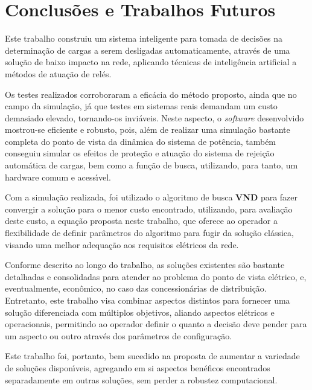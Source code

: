 \chapter{Conclus{\~o}es e Trabalhos Futuros} \label{cap:concl}

Este trabalho construiu um sistema inteligente para tomada de decis{\~o}es na determina{\c c}{\~a}o de cargas a serem desligadas automaticamente, atrav{\'e}s de uma solu{\c c}{\~a}o de baixo impacto na rede, aplicando t{\'e}cnicas de intelig{\^e}ncia artificial a m{\'e}todos de atua{\c c}{\~a}o de rel{\'e}s.

Os testes realizados corroboraram a efic{\'a}cia do m{\'e}todo proposto, ainda que no campo da simula{\c c}{\~a}o, j{\'a} que testes em sistemas reais demandam um custo demasiado elevado, tornando-os invi{\'a}veis. Neste aspecto, o \textit{software} desenvolvido mostrou-se eficiente e robusto, pois, al{\'e}m de realizar uma simula{\c c}{\~a}o bastante completa do ponto de vista da din{\^a}mica do sistema de pot{\^e}ncia, tamb{\'e}m conseguiu simular os efeitos de prote{\c c}{\~a}o e atua{\c c}{\~a}o do sistema de rejei{\c c}{\~a}o autom{\'a}tica de cargas, bem como a fun{\c c}{\~a}o de busca, utilizando, para tanto, um hardware comum e acess{\'\i}vel.

Com a simula{\c c}{\~a}o realizada, foi utilizado o algoritmo de busca \textbf{VND} para fazer convergir a solu{\c c}{\~a}o para o menor custo encontrado, utilizando, para avalia{\c c}{\~a}o deste custo, a equa{\c c}{\~a}o proposta neste trabalho, que oferece ao operador a flexibilidade de definir par{\^a}metros do algoritmo para fugir da solu{\c c}{\~a}o cl{\'a}ssica, visando uma melhor adequa{\c c}{\~a}o aos requisitos el{\'e}tricos da rede.

Conforme descrito ao longo do trabalho, as solu{\c c}{\~o}es existentes s{\~a}o bastante detalhadas e consolidadas para atender ao problema do ponto de vista el{\'e}trico, e, eventualmente, econ{\^o}mico, no caso das concession{\'a}rias de distribui{\c c}{\~a}o. Entretanto, este trabalho visa combinar aspectos distintos para fornecer uma solu{\c c}{\~a}o diferenciada com m{\'u}ltiplos objetivos, aliando aspectos el{\'e}tricos e operacionais, permitindo ao operador definir o quanto a decis{\~a}o deve pender para um aspecto ou outro atrav{\'e}s dos par{\^a}metros de configura{\c c}{\~a}o.

Este trabalho foi, portanto, bem sucedido na proposta de aumentar a variedade de solu{\c c}{\~o}es dispon{\'\i}veis, agregando em si aspectos ben{\'e}ficos encontrados separadamente em outras solu{\c c}{\~o}es, sem perder a robustez computacional.

